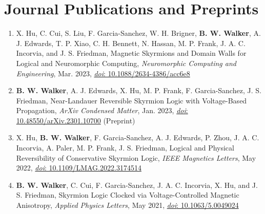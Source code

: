 \documentclass[letterpaper,11pt]{article}
\begin{document}
\section{Journal Publications and Preprints}
    \begin{itemize}[leftmargin=0.15in, label={}]
        \small{\item{
        \begin{enumerate}[leftmargin=0.15in]
          \item \small{X. Hu, C. Cui, S. Liu, F. Garcia-Sanchez, W. H. Brigner, \textbf{B. W. Walker}, A. J. Edwards, T. P. Xiao, C. H. Bennett, N. Hassan, M. P. Frank, J. A. C. Incorvia, and J. S. Friedman, Magnetic Skyrmions and Domain Walls for Logical and Neuromorphic Computing, \textit{Neuromorphic Computing and Engineering}, Mar. 2023, \href{https://doi.org/10.1088/2634-4386/acc6e8}{\textit{doi}: 10.1088/2634-4386/acc6e8}}
          \item \small{\textbf{B. W. Walker}, A. J. Edwards, X. Hu, M. P. Frank, F. Garcia-Sanchez, J. S. Friedman, Near-Landauer Reversible Skyrmion Logic with Voltage-Based Propagation, \textit{ArXiv Condensed Matter}, Jan. 2023, \href{https://doi.org/10.48550/arXiv.2301.10700}{\textit{doi}: 10.48550/arXiv.2301.10700} (Preprint)}
          \item \small{X. Hu, \textbf{B. W. Walker}, F. Garcia-Sanchez, A. J. Edwards, P. Zhou, J. A. C. Incorvia, A. Paler, M. P. Frank, J. S. Friedman, Logical and Physical Reversibility of Conservative Skyrmion Logic, \textit{IEEE Magnetics Letters}, May 2022, \href{https://doi.org/10.1109/LMAG.2022.3174514}{\textit{doi}: 10.1109/LMAG.2022.3174514}}
          \item \small{\textbf{B. W. Walker}, C. Cui, F. Garcia-Sanchez, J. A. C. Incorvia, X. Hu, and J. S. Friedman, Skyrmion Logic Clocked via Voltage-Controlled Magnetic Anisotropy, \textit{Applied Physics Letters}, May 2021, \href{https://doi.org/10.1063/5.0049024}{\textit{doi}: 10.1063/5.0049024}}
        \end{enumerate}
        }}
     \end{itemize}
\end{document}
